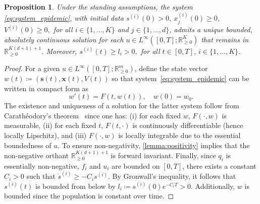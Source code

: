 \documentclass[letterpaper, 10 pt, conference]{ieeeconf}
\newcommand{\R}{\mathbb{R}}
\newcommand{\fori}[1]{#1 \in \{1,\dots, K\}}
\newtheorem{proposition}{Proposition}
\begin{document}
\begin{proposition}\label{prop:positive_invariance_control}
    Under the standing assumptions, the system \eqref{eq:system_epidemic}, with initial data $s^{(i)}(0)>0$, $x^{(i)}_j(0)\ge 0$, $V^{(i)}(0)\ge0,$ for all $\fori{i}$ and $j \in \{1,\dots,d\}$, admits a unique bounded, absolutely continuous solution for each $u\in L^{\infty}([0,T];\mathbb{R}^K_{\ge0})$ that remains in $\mathbb{R}^{K(d+1)+1}_{\ge 0}$.
    Moreover, $s^{(i)}(t) \ge l_i > 0,$ for all $t \in [0,T]$, $i\in \{1,\dots,K\}$.
\end{proposition}

\begin{proof}\label{proof:positive_invariance_control}
    For a given $u \in L^\infty([0,T]; \R^m_{\ge 0})$, define the state vector
    \(
    w(t) \coloneqq (\boldsymbol{s}(t), \boldsymbol{x}(t), V(t))
    \)
    so that system~\eqref{eq:system_epidemic} can be written in compact form as
    \[
    w'(t) = F(t, w(t)), \quad w(0) = w_0.
    \]
    The existence and uniqueness of a solution for the latter system follow from Carath\'eodory's theorem~\cite{coddington1955theory} since one has:
    (i) for each fixed $w$, $F(\cdot, w)$ is measurable, 
    (ii) for each fixed $t$, $F(t, \cdot)$ is continuously differentiable (hence locally Lipschitz), and 
    (iii) $F(\cdot, w)$ is locally integrable due to the essential boundedness of $u$. 
    To ensure non-negativity, \autoref{lemma:positivity} implies that the non-negative orthant $\mathbb{R}^{K(d+1)+1}_{\geq 0}$ is forward invariant. 
    Finally, since $q_i$ is essentially non-negative, $f_i$ and $u_i$ are bounded on $[0,T]$, there exists a constant $C_i>0$ such that $\dot{s}^{(i)} \ge -C_i s^{(i)}$.
    By Gronwall's inequality, it follows that $s^{(i)}(t)$ is bounded from below by $l_i \coloneqq s^{(i)}(0)e^{-C_i T} > 0$.
    Additionally, $w$ is bounded since the population is constant over time.
\end{proof}
\end{document}
